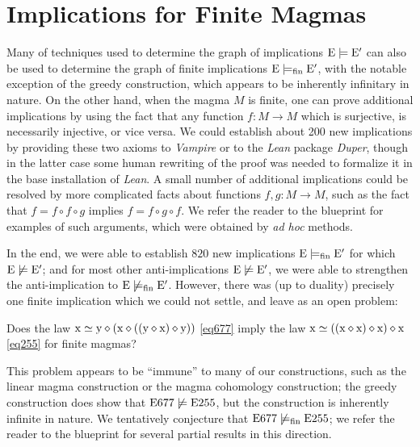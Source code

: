 \section{Implications for Finite Magmas}\label{austin-sec}

Many of techniques used to determine the graph of implications $\mathrm{E} \models \mathrm{E}'$ can also be used to determine the graph of finite implications $\mathrm{E} \models_{\mathrm{fin}} \mathrm{E}'$, with the notable exception of the greedy construction, which appears to be inherently infinitary in nature.  On the other hand, when the magma $M$ is finite, one can prove additional implications by using the fact that any function $f \colon M \to M$ which is surjective, is necessarily injective, or vice versa.  We could establish about 200 new implications by providing these two axioms to \emph{Vampire} or to the \emph{Lean} package \emph{Duper}, though in the latter case some human rewriting of the proof was needed to formalize it in the base installation of \emph{Lean}.  A small number of additional implications could be resolved by more complicated facts about functions $f,g \colon M \to M$, such as the fact that $f = f \circ f \circ g$ implies $f = f \circ g \circ f$.  We refer the reader to the blueprint for examples of such arguments, which were obtained by \emph{ad hoc} methods.

In the end, we were able to establish $820$ new implications $\mathrm{E} \models_{\mathrm{fin}} \mathrm{E}'$ for which $\mathrm{E} \not \models \mathrm{E}'$; and for most other anti-implications $\mathrm{E} \not \models \mathrm{E}'$, we were able to strengthen the anti-implication to $\mathrm{E} \not \models_{\mathrm{fin}} \mathrm{E}'$.  However, there was (up to duality) precisely one finite implication which we could not settle, and leave as an open problem:

\begin{problem}  Does the law $\mathrm{x} \simeq \mathrm{y} \diamond (\mathrm{x} \diamond ((\mathrm{y} \diamond \mathrm{x}) \diamond \mathrm{y}))$ \eqref{eq677} imply the law $\mathrm{x} \simeq ((\mathrm{x} \diamond \mathrm{x}) \diamond \mathrm{x}) \diamond \mathrm{x}$ \eqref{eq255} for finite magmas?
\end{problem}

This problem appears to be ``immune'' to many of our constructions, such as the linear magma construction or the magma cohomology construction; the greedy construction does show that $\mathrm{E}677 \not \models \mathrm{E}255$, but the construction is inherently infinite in nature.  We tentatively conjecture that $\mathrm{E}677 \not \models_{\mathrm{fin}} \mathrm{E}255$; we refer the reader to the blueprint for several partial results in this direction.

